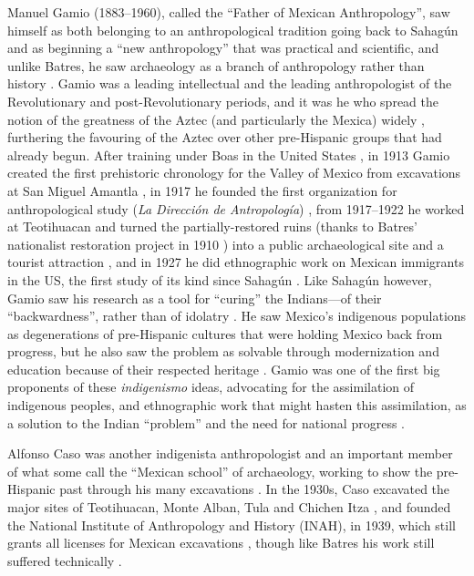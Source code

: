 Manuel Gamio (1883–1960), called the “Father of Mexican Anthropology”, saw himself as both belonging to an anthropological tradition going back to Sahagún and as beginning a “new anthropology” that was practical and scientific, and unlike Batres, he saw archaeology as a branch of anthropology rather than history \parencites[185]{Lobjois2013}[321]{Zermeno2002}. 
Gamio was a leading intellectual and the leading anthropologist of the Revolutionary and post-Revolutionary periods, and it was he who spread the notion of the greatness of the Aztec (and particularly the Mexica) widely \parencites[337]{Caballero2008}[77]{Patterson1995}, 
furthering the favouring of the Aztec over other pre-Hispanic groups that had already begun. After training under Boas in the United States \parencite[164]{Bernal1980}, 
in 1913 Gamio created the first prehistoric chronology for the Valley of Mexico from excavations at San Miguel Amantla \parencite[277]{Trigger2006}, 
in 1917 he founded the first organization for anthropological study (\textit{La Dirección de Antropología}) \parencite[164,186]{Bernal1980}, 
from 1917–1922 he worked at Teotihuacan and turned the partially-restored ruins (thanks to Batres’ nationalist restoration project in 1910 \parencites[267]{Trigger2006}) 
into a public archaeological site and a tourist attraction \parencite[338]{Caballero2008}, 
and in 1927 he did ethnographic work on Mexican immigrants in the US, the first study of its kind since Sahagún \parencite[317]{Zermeno2002}. 
Like Sahagún however, Gamio saw his research as a tool for “curing” the Indians—of their “backwardness”, rather than of idolatry \parencite[323]{Zermeno2002}. 
He saw Mexico’s indigenous populations as degenerations of pre-Hispanic cultures that were holding Mexico back from progress, but he also saw the problem as solvable through modernization and education because of their respected heritage \parencites[338]{Caballero2008}[78]{Patterson1995}. 
Gamio was one of the first big proponents of these \textit{indigenismo} ideas, advocating for the assimilation of indigenous peoples, and ethnographic work that might hasten this assimilation, as a solution to the Indian “problem” and the need for national progress \parencite[60]{Ortiz1996}.

Alfonso Caso was another indigenista anthropologist and an important member of what some call the “Mexican school” of archaeology, working to show the pre-Hispanic past through his many excavations \parencite[Litvak 1978 in][13]{Matos1979}. 
In the 1930s, Caso excavated the major sites of Teotihuacan, Monte Alban, Tula and Chichen Itza \parencites[340]{Caballero2008}[234]{Fowler1987}, 
and founded the National Institute of Anthropology and History (INAH), in 1939, which still grants all licenses for Mexican excavations \parencites[79]{Patterson1995}[277]{Trigger2006}, 
though like Batres his work still suffered technically \parencite[15]{Matos1979}. 

